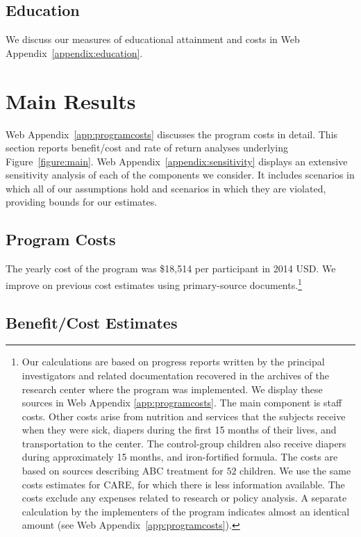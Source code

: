 \subsection{Education}

We discuss our measures of educational attainment and costs in Web Appendix~\ref{appendix:education}. 

\section{Main Results} \label{section:cbaresults} 

Web Appendix~\ref{app:programcosts} discusses the program costs in detail. This section reports benefit/cost and rate of return analyses underlying Figure~\ref{figure:main}. Web Appendix~\ref{appendix:sensitivity} displays an extensive sensitivity analysis of each of the components we consider. It includes scenarios in which all of our assumptions hold and scenarios in which they are violated, providing bounds for our estimates.

\subsection{Program Costs} \label{section:programscosts}

The yearly cost of the program was \$18,514 per participant in 2014 USD. We improve on previous cost estimates using primary-source documents.\footnote{Our calculations are based on progress reports written by the principal investigators and related documentation recovered in the archives of the research center where the program was implemented. We display these sources in Web Appendix \ref{app:programcosts}. The main component is staff costs. Other costs arise from nutrition and services that the subjects receive when they were sick, diapers during the first 15 months of their lives, and transportation to the center. The control-group children also receive diapers during approximately 15 months, and iron-fortified formula. The costs are based on sources describing ABC treatment for $52$ children. We use the same costs estimates for CARE, for which there is less information available. The costs exclude any expenses related to research or policy analysis. A separate calculation by the implementers of the program indicates almost an identical amount (see Web Appendix~\ref{app:programcosts}).}

\subsection{Benefit/Cost Estimates}

